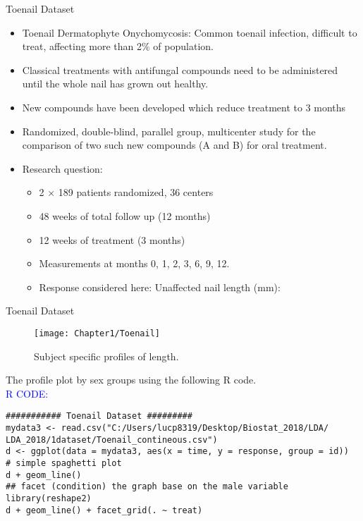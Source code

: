 \documentclass{beamer}
\begin{document}
\begin{frame}{Toenail Dataset}
\begin{itemize}
	\item Toenail Dermatophyte Onychomycosis: Common toenail infection, difficult to treat, affecting more than 2\% of population.
\item Classical treatments with antifungal compounds need to be administered until the whole nail has grown out healthy.
\item New compounds have been developed which reduce treatment to 3 months
\item  Randomized, double-blind, parallel group, multicenter study for the comparison of two such new compounds (A and B) for oral treatment.
\item Research question: \color{red}{Are both treatments equally effective for the treatment of TDO?}
\begin{itemize}
	\item 2 × 189 patients randomized, 36 centers
	\item 48 weeks of total follow up (12 months)
	\item 12 weeks of treatment (3 months)
	\item Measurements at months 0, 1, 2, 3, 6, 9, 12.
	\item Response considered here: Unaffected nail length (mm):
\end{itemize}

\end{itemize}
\end{frame}

\begin{frame}{Toenail Dataset}
\begin{figure}[h!]
	\centering
	\texttt{[image: Chapter1/Toenail]}
	\caption{Subject specific profiles of length. \label{Profile2 by treatment}}
\end{figure}
\end{frame}

\begin{frame}[fragile]
The profile plot by sex groups using the following R code. \\
\vspace{1cm}
\textcolor{blue}{R CODE:} \scriptsize\begin{verbatim}
########### Toenail Dataset #########
mydata3 <- read.csv("C:/Users/lucp8319/Desktop/Biostat_2018/LDA/
LDA_2018/1dataset/Toenail_contineous.csv")
d <- ggplot(data = mydata3, aes(x = time, y = response, group = id))
# simple spaghetti plot
d + geom_line()
## facet (condition) the graph base on the male variable
library(reshape2)
d + geom_line() + facet_grid(. ~ treat)
\end{verbatim}
\end{frame}
\end{document}
